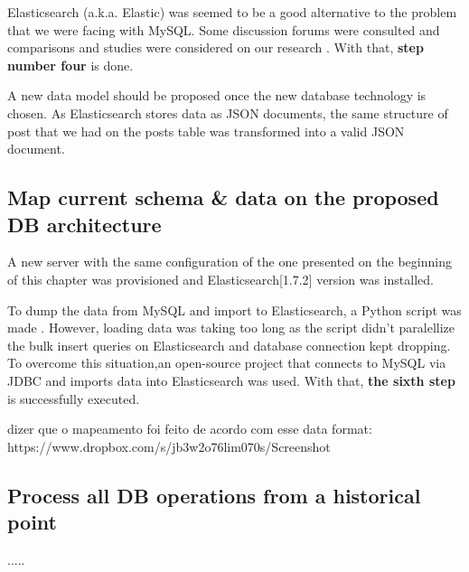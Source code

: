 	Elasticsearch (a.k.a. Elastic) was seemed to be a good alternative to the problem that we were facing with MySQL. Some discussion forums were consulted and comparisons and studies were considered on our research \cite{StackOverflowElastic} \cite{SolrVsES} \cite{quoraES}. With that, \textbf{step number four} is done. 

	A new data model should be proposed once the new database technology is chosen. As Elasticsearch stores data as JSON documents, the same structure of post that we had on the posts table was transformed into a valid JSON document.























\clearpage
\subsection{Map current schema \& data on the proposed DB architecture}

A new server with the same configuration of the one presented on the beginning of this chapter was provisioned and Elasticsearch[1.7.2] version was installed.

To dump the data from MySQL and import to Elasticsearch, a Python script was made \cite{mysqltoes}. However, loading data was taking too long as the script didn't paralellize the bulk insert queries on Elasticsearch and database connection kept dropping. To overcome this situation,an open-source project that connects to MySQL via JDBC and imports data into Elasticsearch \cite{elasticjdbc} was used. 
With that, \textbf{the sixth step} is successfully executed. 

dizer que o mapeamento foi feito de acordo com esse data format: https://www.dropbox.com/s/jb3w2o76lim070s/Screenshot%





















\clearpage
\subsection{Process all DB operations from a historical point}



.....








